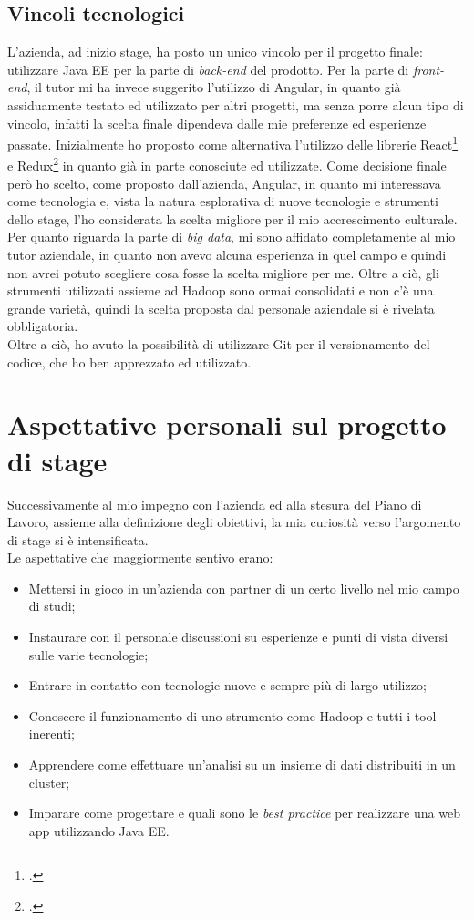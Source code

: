 \subsection{Vincoli tecnologici}
L'azienda, ad inizio stage, ha posto un unico vincolo per il progetto finale: utilizzare Java EE per la parte di \textit{back-end} del prodotto. Per la parte di \textit{front-end}, il tutor mi ha invece suggerito l'utilizzo di Angular, in quanto già assiduamente testato ed utilizzato per altri progetti, ma senza porre alcun tipo di vincolo, infatti la scelta finale dipendeva dalle mie preferenze ed esperienze passate. Inizialmente ho proposto come alternativa l'utilizzo delle librerie React\footcite{site:react} e Redux\footcite{site:redux} in quanto già in parte conosciute ed utilizzate. Come decisione finale però ho scelto, come proposto dall'azienda, Angular, in  quanto mi interessava come tecnologia e, vista la natura esplorativa di nuove tecnologie e strumenti dello stage, l'ho considerata la scelta migliore per il mio accrescimento culturale. \\
Per quanto riguarda la parte di \textit{big data}, mi sono affidato completamente al mio tutor aziendale, in quanto non avevo alcuna esperienza in quel campo e quindi non avrei potuto scegliere cosa fosse la scelta migliore per me. Oltre a ciò, gli strumenti utilizzati assieme ad Hadoop sono ormai consolidati e non c'è una grande varietà, quindi la scelta proposta dal personale aziendale si è rivelata obbligatoria. \\
Oltre a ciò, ho avuto la possibilità di utilizzare \gls{Git} per il versionamento del codice, che ho ben apprezzato ed utilizzato.

\section{Aspettative personali sul progetto di stage}
Successivamente al mio impegno con l'azienda ed alla stesura del Piano di Lavoro, assieme alla definizione degli obiettivi, la mia curiosità verso l'argomento di stage si è intensificata. \\
Le aspettative che maggiormente sentivo erano:
\begin{itemize}
	\item Mettersi in gioco in un'azienda con partner di un certo livello nel mio campo di studi;
	\item Instaurare con il personale discussioni su esperienze e punti di vista diversi sulle varie tecnologie;
	\item Entrare in contatto con tecnologie nuove e sempre più di largo utilizzo;
	\item Conoscere il funzionamento di uno strumento come Hadoop e tutti i tool inerenti;
	\item Apprendere come effettuare un'analisi su un insieme di dati distribuiti in un \gls{cluster};
	\item Imparare come progettare e quali sono le \textit{best practice} per realizzare una \gls{web app} utilizzando Java EE.
\end{itemize}